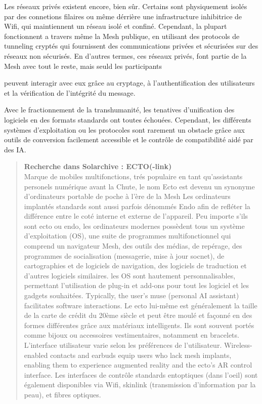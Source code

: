 Les réseaux privés existent encore, bien sûr. Certains sont physiquement isolés par des connetions filaires ou même dérrière une infrastructure inhibitrice de Wifi, qui maintiennent un réseau isolé et confiné. Cependant, la plupart fonctionnent a travers même la Mesh publique, en utilisant des protocols de tunneling cryptés qui fournissent des communications privées et sécurisées sur des réseaux non sécurisés. En d'autres termes, ces réseaux privés, font partie de la Mesh avec tout le reste, mais seuld les participants 

peuvent interagir avec eux grâce au cryptage, à l'authentification des utilisateurs et la vérification de l'intégrité du message. 

Avec le fractionnement de la transhumanité, les tenatives d'unification des logiciels en des formats standards ont toutes échouées. Cependant, les différents systèmes d'exploitation ou les protocoles sont rarement un obstacle grâce aux outils de conversion facilement accessible et le contrôle de compatibilité aidé par des IA. 

\begin{quotation} \textbf{Recherche dans Solarchive : ECTO(-link)} \\ Marque de mobiles multifonctions, trés populaire en tant qu'assistants personels numérique avant la Chute, le nom Ecto est devenu un synonyme d'ordinateurs portable de poche à l'ère de la Mesh Les ordinateurs implantés standards sont aussi parfois dénommés Endo afin de refléter la différence entre le coté interne et externe de l'appareil. Peu importe s'ils sont ecto ou endo, les ordinateurs modernes possèdent tous un système d'exploitation (OS), une suite de programmes multifonctionnel qui comprend un navigateur Mesh, des outils des médias, de repérage, des programmes de socialisation (messagerie, mise à jour socnet), de cartographies et de logiciels de navigation, des logiciels de traduction et d'autres logiciels similaires. les OS sont hautement personnalisables, permettant l'utilisation de plug-in et add-ons pour tout les logiciel et les gadgets souhaitées. Typically, the user’s muse (personal AI assistant) facilitates software interactions. Le ecto lui-même est généralement la taille de la carte de crédit du 20ème siècle et peut être moulé et façonné en des formes différentes grâce aux matériaux intelligents. Ils sont souvent portés comme bijoux ou accessoires vestimentaires, notamment en bracelets. L'interface utilisateur varie selon les préférences de l'utilisateur. Wireless-enabled contacts and earbuds equip users who lack mesh implants, enabling them to experience augmented reality and the ecto’s AR control interface. Les interfaces de contrôle standards entoptiques (dans l'oeil)  sont également disponibles via Wifi, skinlink (transmission d'information par la peau), et fibres optiques. \end{quotation} 



